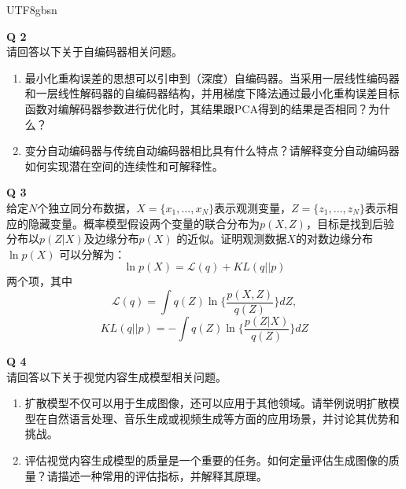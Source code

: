 \documentclass[a4paper, 11pt]{article}
\newenvironment{problem}[2][Q]
    { \begin{mdframed}[backgroundcolor=gray!20] \textbf{#1 #2} \\}
    {  \end{mdframed}}
\begin{document}
\begin{CJK}{UTF8}{gbsn}
\begin{problem}{2}
请回答以下关于自编码器相关问题。
\begin{enumerate}[1)]
\item 最小化重构误差的思想可以引申到（深度）自编码器。当采用一层线性编码器和一层线性解码器的自编码器结构，并用梯度下降法通过最小化重构误差目标函数对编解码器参数进行优化时，其结果跟PCA得到的结果是否相同？为什么？
\item 变分自动编码器与传统自动编码器相比具有什么特点？请解释变分自动编码器如何实现潜在空间的连续性和可解释性。
\end{enumerate}
\end{problem}


\begin{problem}{3}
给定$N$个独立同分布数据，$X=\{x_1,...,x_N\}$表示观测变量，$Z=\{z_1,...,z_N\}$表示相应的隐藏变量。概率模型假设两个变量的联合分布为$p(X,Z)$，目标是找到后验分布以$p(Z|X)$及边缘分布$p(X)$ 的近似。证明观测数据$X$的对数边缘分布 $\ln p(X)$ 可以分解为：
$$\ln p(X)=\mathcal{L}(q)+KL(q||p)$$
两个项，其中
$$\mathcal{L}(q)=\int q(Z)\ln \{\frac{p(X,Z)}{q(Z)}\}dZ,$$
$$KL(q||p)=-\int q(Z)\ln \{\frac{p(Z|X)}{q(Z)}\}dZ$$
\end{problem}



\begin{problem}{4}
请回答以下关于视觉内容生成模型相关问题。
\begin{enumerate}[1)]
\item 扩散模型不仅可以用于生成图像，还可以应用于其他领域。请举例说明扩散模型在自然语言处理、音乐生成或视频生成等方面的应用场景，并讨论其优势和挑战。
\item 评估视觉内容生成模型的质量是一个重要的任务。如何定量评估生成图像的质量？请描述一种常用的评估指标，并解释其原理。
\end{enumerate}
\end{problem}


\end{CJK}
\end{document}
